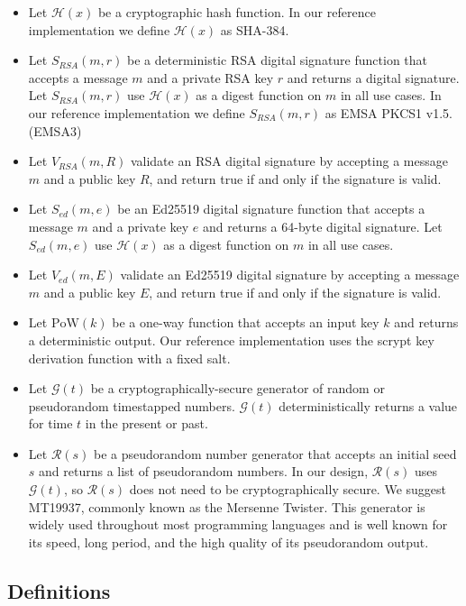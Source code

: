 \documentclass[conference]{IEEEtran}
\begin{document}
\begin{itemize}
	\item Let $ \mathcal{H}(x) $ be a cryptographic hash function. In our reference implementation we define $ \mathcal{H}(x) $ as SHA-384.
	\item Let $ S_{\mathit{RSA}}(m, r) $ be a deterministic RSA digital signature function that accepts a message $ m $ and a private RSA key $ r $ and returns a digital signature. Let $ S_{\mathit{RSA}}(m, r) $ use $ \mathcal{H}(x) $ as a digest function on $ m $ in all use cases. In our reference implementation we define $ S_{\mathit{RSA}}(m, r) $ as EMSA PKCS1 v1.5. (EMSA3)
	\item Let $ V_{\mathit{RSA}}(m, R) $ validate an RSA digital signature by accepting a message $ m $ and a public key $ R $, and return true if and only if the signature is valid.
	\item Let $ S_{\mathit{ed}}(m, e) $ be an Ed25519 digital signature function that accepts a message $ m $ and a private key $ e $ and returns a 64-byte digital signature. Let $ S_{\mathit{ed}}(m, e) $ use $ \mathcal{H}(x) $ as a digest function on $ m $ in all use cases.
	\item Let $ V_{\mathit{ed}}(m, E) $ validate an Ed25519 digital signature by accepting a message $ m $ and a public key $ E $, and return true if and only if the signature is valid.
	\item Let $ \mathrm{PoW}(k) $ be a one-way function that accepts an input key $ k $ and returns a deterministic output. Our reference implementation uses the scrypt\cite{percival2012scrypt} key derivation function with a fixed salt.
	\item Let $ \mathcal{G}(t) $ be a cryptographically-secure generator of random or pseudorandom timestapped numbers. $ \mathcal{G}(t) $ deterministically returns a value for time $ t $ in the present or past.
	\item Let $ \mathcal{R}(s) $ be a pseudorandom number generator that accepts an initial seed $ s $ and returns a list of pseudorandom numbers. In our design, $ \mathcal{R}(s) $ uses $ \mathcal{G}(t) $, so $ \mathcal{R}(s) $ does not need to be cryptographically secure. We suggest MT19937, commonly known as the Mersenne Twister. This generator is widely used throughout most programming languages and is well known for its speed, long period, and the high quality of its pseudorandom output\cite{matsumoto1998mersenne}.
\end{itemize}

\subsection{Definitions}
\end{document}
